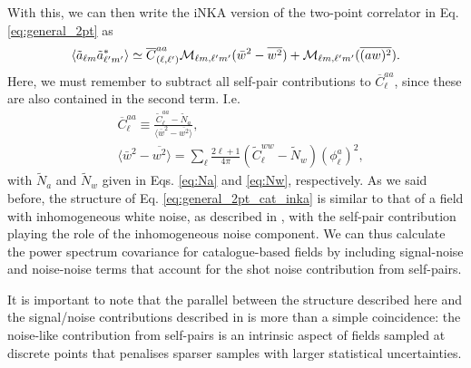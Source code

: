 \documentclass[aps,twocolumn, superscriptaddress, english, nofootinbib, 10pt]{revtex4-2}
\begin{document}
    With this, we can then write the iNKA version of the two-point correlator in Eq. \ref{eq:general_2pt} as
    \begin{equation}\label{eq:general_2pt_cat_inka}
      \langle \tilde{a}_{\ell m}\tilde{a}^*_{\ell'm'}\rangle\simeq \overline{C}^{aa}_{(\ell,\ell')}{\cal M}_{\ell m,\ell'm'}(\bar{w}^2-\overline{w^2})+{\cal M}_{\ell m,\ell'm'}(\overline{(aw)^2}).
    \end{equation}
    Here, we must remember to subtract all self-pair contributions to $\overline{C}^{aa}_\ell$, since these are also contained in the second term. I.e.
    \begin{align}
      &\overline{C}^{aa}_\ell\equiv\frac{\tilde{C}^{aa}_\ell-\tilde{N}_a}{\langle \bar{w}^2-\overline{w^2}\rangle},\\
      &\langle \bar{w}^2-\overline{w^2}\rangle=\sum_\ell\frac{2\ell+1}{4\pi}(\tilde{C}^{ww}_\ell-\tilde{N}_w)(\phi^a_\ell)^2,
    \end{align}
    with $\tilde{N}_a$ and $\tilde{N}_w$ given in Eqs. \ref{eq:Na} and \ref{eq:Nw}, respectively. As we said before, the structure of Eq. \ref{eq:general_2pt_cat_inka} is similar to that of a field with inhomogeneous white noise, as described in \cite{2010.09717}, with the self-pair contribution playing the role of the inhomogeneous noise component. We can thus calculate the power spectrum covariance for catalogue-based fields by including signal-noise and noise-noise terms that account for the shot noise contribution from self-pairs.

    It is important to note that the parallel between the structure described here and the signal/noise contributions described in \cite{2010.09717} is more than a simple coincidence: the noise-like contribution from self-pairs is an intrinsic aspect of fields sampled at discrete points that penalises sparser samples with larger statistical uncertainties.
\end{document}
